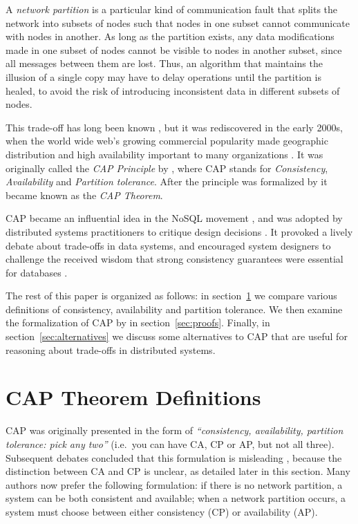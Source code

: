 \documentclass[fleqn,12pt,lineno]{wlpeerj} %
\begin{document}
A \emph{network partition} is a particular kind of communication fault that splits the network into
subsets of nodes such that nodes in one subset cannot communicate with nodes in another. As long as
the partition exists, any data modifications made in one subset of nodes cannot be visible to nodes
in another subset, since all messages between them are lost. Thus, an algorithm that maintains the
illusion of a single copy may have to delay operations until the partition is healed, to avoid the
risk of introducing inconsistent data in different subsets of nodes.

This trade-off has long been known \citep{Johnson1975we,Lindsay1979wv,Fischer1982hc,Davidson1985hv},
but it was rediscovered in the early 2000s, when the world wide web's growing commercial popularity
made geographic distribution and high availability important to many organizations
\citep{Brewer2012tr,Vogels2008ey}. It was originally called the \emph{CAP Principle} by
\citet{Fox1999bs,Brewer2000vd}, where CAP stands for \emph{Consistency}, \emph{Availability} and
\emph{Partition tolerance}. After the principle was formalized by \citet{Gilbert2002il}
it became known as the \emph{CAP Theorem}.

CAP became an influential idea in the NoSQL movement \citep{Vogels2008ey}, and was adopted by
distributed systems practitioners to critique design decisions \citep{Hodges2013tj}. It provoked a
lively debate about trade-offs in data systems, and encouraged system designers to challenge the
received wisdom that strong consistency guarantees were essential for databases
\citep{Brewer2012ba,Gilbert2012bf}.

The rest of this paper is organized as follows: in section~\ref{sec:definitions} we compare various
definitions of consistency, availability and partition tolerance. We then examine the formalization
of CAP by \citet{Gilbert2002il} in section~\ref{sec:proofs}. Finally, in
section~\ref{sec:alternatives} we discuss some alternatives to CAP that are useful for reasoning
about trade-offs in distributed systems.

\section{CAP Theorem Definitions}\label{sec:definitions}

CAP was originally presented in the form of \emph{``consistency, availability, partition tolerance:
pick any two''} (i.e.\ you can have CA, CP or AP, but not all three). Subsequent debates concluded
that this formulation is misleading \citep{Brewer2012ba,Hale2010we,Robinson2010tp}, because the
distinction between CA and CP is unclear, as detailed later in this section. Many authors now prefer
the following formulation: if there is no network partition, a system can be both consistent and
available; when a network partition occurs, a system must choose between either consistency (CP) or
availability (AP).
\end{document}
